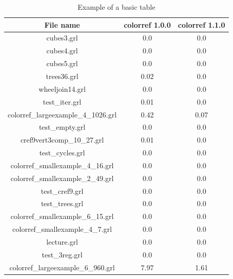 \documentclass[11pt]{article}
\begin{document}
\begin{table}[h!]
    \centering
    \begin{tabular}{|c|c|c|}
        \hline
        File name & colorref 1.0.0 & colorref 1.1.0 \\
        \hline
		cubes3.grl & 0.0 & 0.0 \\
		cubes4.grl & 0.0 & 0.0 \\
		cubes5.grl & 0.0 & 0.0 \\
		trees36.grl & 0.02 & 0.0 \\
		wheeljoin14.grl & 0.0 & 0.0 \\
		test\_iter.grl & 0.01 & 0.0 \\
		colorref\_largeexample\_4\_1026.grl & 0.42 & 0.07 \\
		test\_empty.grl & 0.0 & 0.0 \\
		cref9vert3comp\_10\_27.grl & 0.01 & 0.0 \\
		test\_cycles.grl & 0.0 & 0.0 \\
		colorref\_smallexample\_4\_16.grl & 0.0 & 0.0 \\
		colorref\_smallexample\_2\_49.grl & 0.0 & 0.0 \\
		test\_cref9.grl & 0.0 & 0.0 \\
		test\_trees.grl & 0.0 & 0.0 \\
		colorref\_smallexample\_6\_15.grl & 0.0 & 0.0 \\
		colorref\_smallexample\_4\_7.grl & 0.0 & 0.0 \\
		lecture.grl & 0.0 & 0.0 \\
		test\_3reg.grl & 0.0 & 0.0 \\
		colorref\_largeexample\_6\_960.grl & 7.97 & 1.61 \\
        \hline
    \end{tabular}
    \caption{Example of a basic table}
    \label{tab:1}
\end{table}
\end{document}
